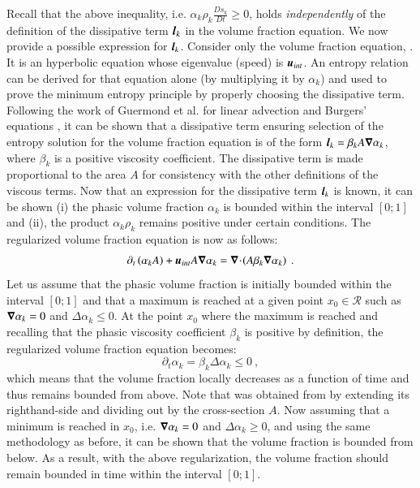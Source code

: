 Recall that the above inequality, i.e. $\alpha_k \rho_k \frac{D s_k}{Dt} \geq 0$, holds {\it independently} of the definition of the dissipative term $\boldsymbol l_k$
in the volume fraction equation. We now provide a possible expression for $\boldsymbol l_k$.
Consider only the volume fraction equation, . It is an hyperbolic equation
whose eigenvalue (speed) is $\boldsymbol u_{int}$. An entropy relation can be derived for that equation alone (by multiplying it by $\alpha_k$)
and used to prove the minimum entropy principle by properly choosing the dissipative term.
Following the work of Guermond et al. for linear advection and Burgers' equations \cite{jlg1,jlg2}, it can be shown that a dissipative term ensuring 
selection of the entropy solution for the volume fraction equation is of the form $\boldsymbol l_k = \beta_k A \boldsymbol\nabla \alpha_k $, where $\beta_k$
is a positive viscosity coefficient. The dissipative term is made proportional to the area $A$ for consistency with 
the other definitions of the viscous terms. Now that an expression for the dissipative term $\boldsymbol l_k$ is known, it can be shown (i) the phasic
volume fraction $\alpha_k$ is bounded within the interval $[0;1]$ and (ii), the product $\alpha_k \rho_k$ remains positive under certain conditions.
The regularized volume fraction equation is now as follows:
%
\begin{equation}\label{eq:final-reg-vf-equ}
\partial_t \left( \alpha_k A \right) + \boldsymbol u_{int} A \boldsymbol\nabla \alpha_k= \boldsymbol\nabla\! \cdot \! \left( A \beta_k \boldsymbol\nabla \alpha_k \right) \ .
\end{equation}
%
Let us assume that the phasic volume fraction is initially bounded within the interval $[0;1]$ and that a maximum is reached at a given point $x_0 \in \mathcal{R}$
such as $\boldsymbol\nabla \alpha_k = 0$ and $\Delta \alpha_k \leq 0$. At the point $x_0$ where the maximum is reached and recalling that the phasic viscosity coefficient
$\beta_k$ is positive by definition, the regularized volume fraction equation becomes:
%
\begin{equation}\label{eq:final-reg-vf-equ-max}
\partial_t \alpha_k = \beta_k \Delta \alpha_k \leq 0 \ ,
\end{equation}
%
which means that the volume fraction locally decreases as a function of time and thus remains bounded from above. 
Note that  was obtained from  
by extending its righthand-side and dividing out by the cross-section $A$. Now assuming that a minimum is reached in $x_0$, i.e. $\boldsymbol\nabla \alpha_k = 0$ and $\Delta \alpha_k \geq 0$,
and using the same methodology as before, it can be shown that the volume fraction is bounded from below. As a result, with the above regularization, the volume fraction
should remain bounded in time within the interval $[0;1]$.

